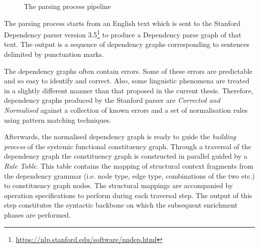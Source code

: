 \begin{figure}[!ht]
        \caption[]{The parsing process pipeline}
        \label{fig:pipeline-overview}
    \end{figure}
    
    
    The parsing process starts from an English text which is sent to the Stanford Dependency parser \citep{chen2014fast} version 3.5\footnote{\url{https://nlp.stanford.edu/software/nndep.html}} to produce a Dependency parse graph of that text. The output is a sequence of dependency graphs corresponding to sentences delimited by punctuation marks.
    
    The dependency graphs often contain errors. Some of these errors are predictable and so easy to identify and correct. Also, some linguistic phenomena are treated in a slightly different manner than that proposed in the current thesis. Therefore, dependency graphs produced by the Stanford parser are \textit{Corrected and Normalised} against a collection of known errors and a set of normalisation rules using pattern matching techniques.
    
    Afterwards, the normalised dependency graph is ready to guide the \textit{building process} of the systemic functional constituency graph. Through a traversal of the dependency graph the constituency graph is constructed in parallel guided by a \textit{Rule Table}. This table contains the mapping of structural context fragments from the dependency grammar (i.e. node type, edge type, combinations of the two etc.) to constituency graph nodes. The structural mappings are accompanied by operation specifications to perform during each traversal step. The output of this step constitutes the syntactic backbone on which the subsequent enrichment phases are performed.
    
